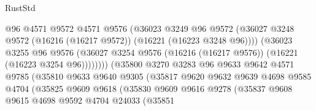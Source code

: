 \begin{lexlean}{RustStd}
\begin{coremodule}
                                      @96
                                      @4571
                                      @9572
                                      @4571
                                      @9576
                                      (@36023
                                        @3249
                                        @96
                                        @9572
                                        (@36027
                                          @3248
                                          @9572
                                          (@16216 (@16217 @9572))
                                          (@16221 (@16223 @3248 @96))))
                                      (@36023
                                        @3255
                                        @96
                                        @9576
                                        (@36027
                                          @3254
                                          @9576
                                          (@16216 (@16217 @9576))
                                          (@16221 (@16223 @3254 @96))))))))
                              (@35800
                                @3270
                                @3283
                                @96
                                @9633
                                @9642
                                @4571
                                @9785
                                (@35810
                                  @9633
                                  @9640
                                  @9305
                                  (@35817
                                    @9620
                                    @9632
                                    @9639
                                    @4698
                                    @9585
                                    @4704
                                    (@35825
                                      @9609
                                      @9618
                                      (@35830
                                        @9609
                                        @9616
                                        @9278
                                        (@35837
                                          @9608
                                          @9615
                                          @4698
                                          @9592
                                          @4704
                                          @24033
                                          (@35851

\end{coremodule}
\end{lexlean}
